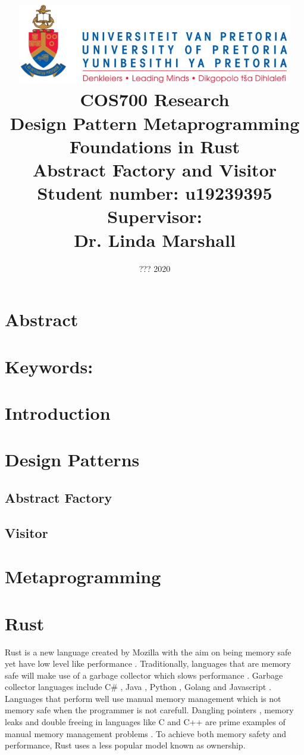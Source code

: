 \documentclass[a4paper,10pt]{article}
\title
{
   \includegraphics[width=12cm]{up_logo.png} \\
   \vspace{2cm}
   \textbf{COS700 Research} \\ \vspace{0.5cm}
   \textbf{Design Pattern Metaprogramming Foundations in Rust\\ \large Abstract Factory and Visitor} \\ \vspace{0.5cm}
   \textbf{Student number:} u19239395 \\ \vspace{0.5cm}
   \textbf{Supervisor}: \\ Dr. Linda Marshall
}
\date{??? 2020}
\begin{document}
\author{}

\maketitle

\newpage
\linespread{1.25}

\section*{Abstract}

\section*{Keywords:}

\newpage

\section{Introduction}

\section{Design Patterns}

\subsection{Abstract Factory}

\subsection{Visitor}

\section{Metaprogramming}

\section{Rust}
Rust is a new language created by Mozilla with the aim on being memory safe yet have low level like performance \cite{klabnik_2019_01}. Traditionally, languages that are memory safe will make use of a garbage collector which slows performance \cite{hertz_05_01}. Garbage collector languages include C\# \cite{robinson_04_01}, Java \cite{gosling_96_01}, Python \cite{martelli_06_01}, Golang \cite{tsoukalos_18_01} and Javascript \cite{flanagan_06_01}. Languages that perform well use manual memory management which is not memory safe when the programmer is not carefull. Dangling pointers \cite{caballero_12_01}, memory leaks \cite{wilson_92_01} and double freeing \cite{sharp_13_01} in languages like C and C++ are prime examples of manual memory management problems \cite{konrad_18_01}. To achieve both memory safety and performance, Rust uses a less popular model known as ownership.
\end{document}
